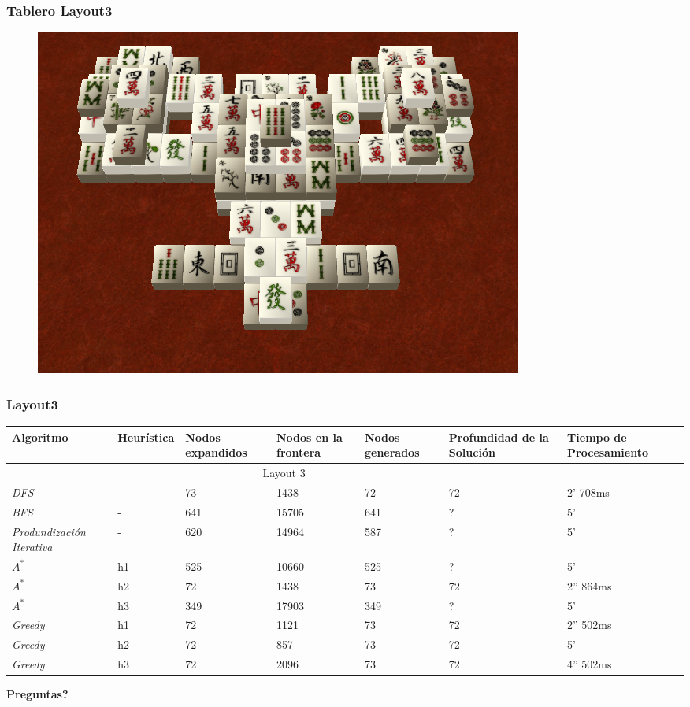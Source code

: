 \documentclass{beamer}
\begin{document}
\begin{frame}
\frametitle{Tablero Layout3}
\begin{figure}[hb]
	\includegraphics[scale=0.3]{../Boards/Layout4.png}
	 \label{fig:layout4}
\end{figure}
\end{frame}

\begin{frame}
\frametitle{Layout3}

\tiny{
\begin{table}[h]
\begin{center}
	\begin{tabular}{|p{1.3cm}|p{1.0cm}|p{1cm}|p{1cm}|p{1cm}|p{1cm}|p{2cm}|}
	\hline
	 Algoritmo & Heur\'istica & Nodos expandidos & Nodos en la frontera & Nodos generados & Profundidad de la Soluci\'on & Tiempo de Procesamiento\\
	\hline \hline
		 \multicolumn{6}{|c|}{Layout 3} \\
	\hline
	\textit{DFS} & - & 73 & 1438 & 72 & 72 & 2' 708ms \\
	\textit{BFS} & - & 641 & 15705 & 641 & ? & 5' \\
	\textit{Produndizaci\'on Iterativa} & - & 620 & 14964 & 587 & ? & 5' \\	
	\textit{$A^*$} & h1 & 525 &  10660 & 525 & ? & 5' \\
	\textit{$A^*$} & h2 & 72 & 1438 & 73 & 72 & 2'' 864ms\\
	\textit{$A^*$} & h3 & 349 & 17903 & 349 & ? & 5' \\	
	\textit{Greedy} & h1 & 72 & 1121 & 73 & 72 & 2'' 502ms\\
	\textit{Greedy} & h2 & 72 & 857 & 73 & 72 & 5'\\
	\textit{Greedy} & h3 & 72 & 2096 & 73 & 72 & 4'' 502ms\\
	\hline
	\end{tabular}
\end{center}
\label{tab:costLayout4}
\end{table}}

\end{frame}

\begin{frame}
\textbf{\Huge{Preguntas?}}
\end{frame}
\end{document}
